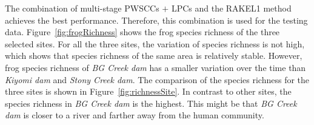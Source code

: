 The combination of multi-stage PWSCCs $+$ LPCs and the RAKEL1 method achieves the best performance. Therefore, this combination is used for the testing data. Figure~\ref{fig:frogRichness} shows the frog species richness of the three selected sites. For all the three sites, the variation of species richness is not high, which shows that species richness of the same area is relatively stable. However, frog species richness of \textit{BG Creek dam} has a smaller variation over the time than \textit{Kiyomi dam} and \textit{Stony Creek dam}. The comparison of the species richness for the three sites is shown in Figure~\ref{fig:richnessSite}. In contrast to other sites, the species richness in \textit{BG Creek dam} is the highest. This might be that \textit{BG Creek dam} is closer to a river and farther away from the human community.


